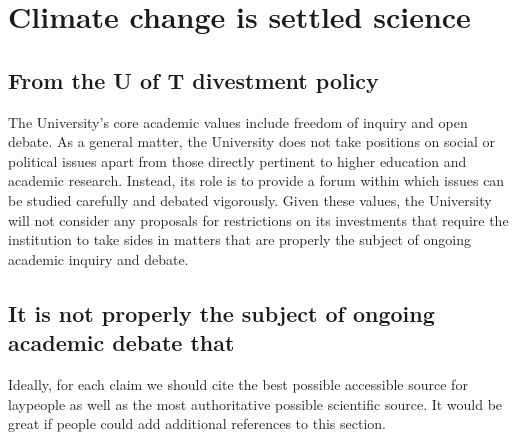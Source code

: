 
		\section{Climate change is settled science}


	
	\subsection{From the U of T divestment policy}


\begin{itquote}	
The University's core academic values include freedom of inquiry and open debate.
As a general matter, the University does not take positions on social or political issues apart from those directly pertinent to higher education and academic research. 
Instead, its role is to provide a forum within which issues can be studied carefully and debated vigorously. 
Given these values, the University will not consider any proposals for restrictions on its investments that require the institution to take sides in matters that are properly the subject of ongoing academic inquiry and debate.
\end{itquote}



	\subsection{It is not properly the subject of ongoing academic debate that}


\begin{vcom}
Ideally, for each claim we should cite the best possible accessible source for laypeople as well as the most authoritative possible scientific source. It would be great if people could add additional references to this section.
\end{vcom}

